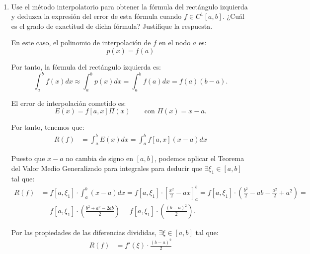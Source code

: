 \begin{ejercicio}\label{ej:2.1.11}~
    \begin{enumerate}
        \item Use el método interpolatorio para obtener la fórmula del rectángulo izquierda y deduzca la expresión del error de esta fórmula cuando $f \in C^1[a, b]$. ¿Cuál es el grado de exactitud de dicha fórmula? Justifique la respuesta.
        
        En este caso, el polinomio de interpolación de $f$ en el nodo $a$ es:
        \begin{equation*}
            p(x) = f(a)
        \end{equation*}

        Por tanto, la fórmula del rectángulo izquierda es:
        \begin{equation*}
            \int_{a}^{b} f(x) dx \approx \int_{a}^{b} p(x) dx = \int_{a}^{b} f(a) dx = f(a)(b - a).
        \end{equation*}

        El error de interpolación cometido es:
        \begin{equation*}
            E(x) = f[a,x]\Pi(x)\qquad \text{con } \Pi(x) = x - a.
        \end{equation*}

        Por tanto, tenemos que:
        \begin{align*}
            R(f) &= \int_{a}^{b} E(x) dx = \int_{a}^{b} f[a,x](x - a) dx
        \end{align*}

        Puesto que $x - a$ no cambia de signo en $[a, b]$, podemos aplicar el Teorema del Valor Medio Generalizado para integrales para deducir que $\exists \xi_1 \in [a, b]$ tal que:
        \begin{align*}
            R(f) &= f[a,\xi_1]\cdot \int_{a}^{b} (x - a) dx
            = f[a,\xi_1]\cdot \left[ \frac{x^2}{2} - ax \right]_{a}^{b}
            = f[a,\xi_1]\cdot \left( \frac{b^2}{2} - ab - \frac{a^2}{2} + a^2 \right)
            =\\&= f[a,\xi_1]\cdot \left( \frac{b^2 + a^2 - 2ab}{2} \right)
            = f[a,\xi_1]\cdot \left( \frac{(b - a)^2}{2} \right).
        \end{align*}

        Por las propiedades de las diferencias divididas, $\exists \xi \in [a, b]$ tal que:
        \begin{align*}
            R(f) &= f'(\xi)\cdot \frac{(b - a)^2}{2}
        \end{align*}


\end{enumerate}
\end{ejercicio}
